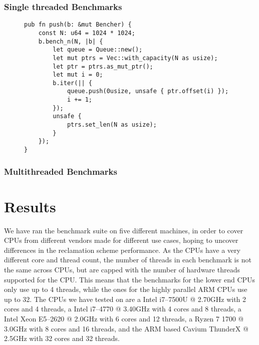 \documentclass[b5paper]{report}
\begin{document}
\subsection{Single threaded Benchmarks}

\begin{figure}[ht]
  \begin{lstlisting}[caption=Microbenchmark of a data structure without memory
  reclamation,label=lst:bench-nothing]
pub fn push(b: &mut Bencher) {
    const N: u64 = 1024 * 1024;
    b.bench_n(N, |b| {
        let queue = Queue::new();
        let mut ptrs = Vec::with_capacity(N as usize);
        let ptr = ptrs.as_mut_ptr();
        let mut i = 0;
        b.iter(|| {
            queue.push(0usize, unsafe { ptr.offset(i) });
            i += 1;
        });
        unsafe {
            ptrs.set_len(N as usize);
        }
    });
}
  \end{lstlisting}
\end{figure}


\subsection{Multithreaded Benchmarks}




\chapter{Results}\label{ch:results}

We have ran the benchmark suite on five different machines, in order to cover
CPUs from different vendors made for different use cases, hoping to uncover
differences in the reclamation scheme performance. As the CPUs have a very
different core and thread count, the number of threads in each benchmark is not
the same across CPUs, but are capped with the number of hardware threads
supported for the CPU\@. This means that the benchmarks for the lower end CPUs
only use up to 4 threads, while the ones for the highly parallel ARM CPUs use
up to 32. The CPUs we have tested on are a Intel\textregistered{} i7--7500U @
2.70GHz with 2 cores and 4 threads, a Intel\textregistered{} i7--4770 @ 3.40GHz
with 4 cores and 8 threads, a Intel\textregistered{} Xeon\textregistered{}
E5--2620 @ 2.0GHz with 6 cores and 12 threads, a Ryzen 7 1700 @ 3.0GHz with 8
cores and 16 threads, and the ARM based Cavium ThunderX @ 2.5GHz with 32 cores
and 32 threads.
\end{document}
